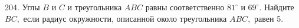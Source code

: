 204. Углы $B$ и $C$ и треугольника $ABC$ равны соответственно $81^\circ$ и $69^\circ.$ Найдите $BC,$ если радиус окружности, описанной около треугольника $ABC,$ равен 5.\\
